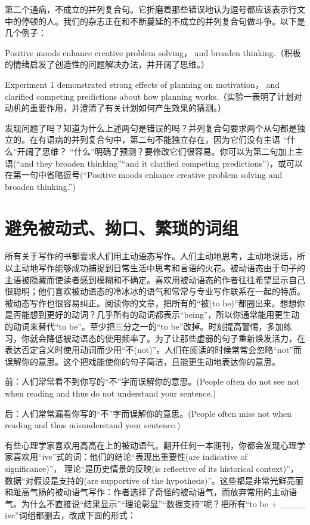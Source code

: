 第二个通病，不成立的并列复合句。它折磨着那些错误地认为逗号都应该表示行文中的停顿的人。我们的杂志正在和不断蔓延的不成立的并列复合句做斗争。以下是几个例子：

{\kaishu Positive moods enhance creative problem solving， and broaden thinking.（积极的情绪启发了创造性的问题解决办法，并开阔了思维。）

Experiment 1 demonstrated strong effects of planning on motivation， and clarified competing predictions about how planning works.（实验一表明了计划对动机的重要作用，并澄清了有关计划如何产生效果的猜测。）}

发现问题了吗？知道为什么上述两句是错误的吗？并列复合句要求两个从句都是独立的。在有语病的并列复合句中，第二句不能独立存在，因为它们没有主语 “什么”开阔了思维？ “什么”明确了预测？要修改它们很容易。你可以为第二句加上主语(“and they broaden thinking”“and it clarified competing predictions”)，或可以在第一句中省略逗号(“Positive moods enhance creative problem solving and broaden thinking.”)


\section{避免被动式、拗口、繁琐的词组}
所有关于写作的书都要求人们用主动语态写作。人们主动地思考，主动地说话，所以主动地写作能够成功捕捉到日常生活中思考和言语的火花。被动语态由于句子的主语被隐藏而使读者感到模糊和不确定。喜欢用被动语态的作者往往希望显示自己很聪明；他们喜欢被动语态的冷冰冰的语气和常常与专业写作联系在一起的特质。被动态写作也很容易纠正。阅读你的文章，把所有的“被(to be)”都圈出来。想想你是否能想到更好的动词？几乎所有的动词都表示“being”，所以你通常能用更生动的动词来替代“to be”。至少把三分之一的“to be”改掉。时刻提高警惕，多加练习，你就会降低被动语态的使用频率了。为了让那些虚弱的句子重新焕发活力，在表达否定含义时使用动词而少用“不(not)”。人们在阅读的时候常常会忽略“not”而误解你的意思。这个把戏能使你的句子简洁，且能更生动地表达你的意思。

{\kaishu 前：人们常常看不到你写的“不”字而误解你的意思。(People often do not see not when reading and thus do not understand your sentence.)

后：人们常常漏看你写的“不”字而误解你的意思。(People often miss not when reading and thus misunderstand your sentence.)}

有些心理学家喜欢用高高在上的被动语气。翻开任何一本期刊，你都会发现心理学家喜欢用“ive”式的词：他们的结论“表现出重要性(are indicative of significance)”， 理论“是历史情景的反映(is reflective of its historical context)”， 数据“对假设是支持的(are supportive of the hypothesis)”。这些都是非常光鲜亮丽
和趾高气扬的被动语气写作：作者选择了奇怪的被动语气，而放弃常用的主动语气。为什么不直接说“结果显示”“理论彰显”“数据支持”呢？把所有“to be + \_\_\_\_ ivc”词组都删去，改成下面的形式：

